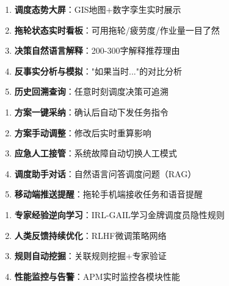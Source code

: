 \documentclass[12pt,a4paper]{article}
\begin{document}
\vspace{0.3cm}

\begin{tcolorbox}[colback=cyan!5!white,colframe=cyan!75!black,title=\textbf{D. 决策支持与可视化（5项）}]
\begin{enumerate}[leftmargin=*, itemsep=5pt]
    \item \textbf{调度态势大屏}：GIS地图+数字孪生实时展示
    \item \textbf{拖轮状态实时看板}：可用拖轮/疲劳度/作业量一目了然
    \item \textbf{决策自然语言解释}：200-300字解释推荐理由
    \item \textbf{反事实分析与模拟}："如果当时..."的对比分析
    \item \textbf{历史回溯查询}：任意时刻调度决策可追溯
\end{enumerate}
\end{tcolorbox}

\vspace{0.3cm}

\begin{tcolorbox}[colback=purple!5!white,colframe=purple!75!black,title=\textbf{E. 人机协同功能（5项）}]
\begin{enumerate}[leftmargin=*, itemsep=5pt]
    \item \textbf{方案一键采纳}：确认后自动下发任务指令
    \item \textbf{方案手动调整}：修改后实时重算影响
    \item \textbf{应急人工接管}：系统故障自动切换人工模式
    \item \textbf{调度助手对话}：自然语言问答调度问题（RAG）
    \item \textbf{移动端推送提醒}：拖轮手机端接收任务和语音提醒
\end{enumerate}
\end{tcolorbox}

\vspace{0.3cm}

\begin{tcolorbox}[colback=orange!5!white,colframe=orange!75!black,title=\textbf{F. 学习与优化功能（4项）}]
\begin{enumerate}[leftmargin=*, itemsep=5pt]
    \item \textbf{专家经验逆向学习}：IRL-GAIL学习金牌调度员隐性规则
    \item \textbf{人类反馈持续优化}：RLHF微调策略网络
    \item \textbf{规则自动挖掘}：关联规则挖掘+专家验证
    \item \textbf{性能监控与告警}：APM实时监控各模块性能
\end{enumerate}
\end{tcolorbox}
\end{document}

